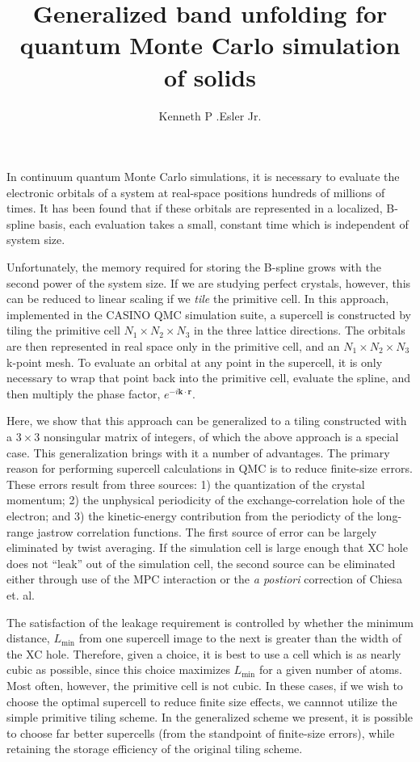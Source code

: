 \documentclass{article}
\author{Kenneth P .Esler Jr.}
\title{Generalized band unfolding for quantum Monte Carlo simulation
  of solids}
\begin{document}
\maketitle
In continuum quantum Monte Carlo simulations, it is necessary to
evaluate the electronic orbitals of a system at real-space positions
hundreds of millions of times.  It has been found that if
these orbitals are represented in a localized, B-spline basis, each
evaluation takes a small, constant time which is independent of system
size.

Unfortunately, the memory required for storing the B-spline grows with
the second power of the system size.  If we are studying perfect
crystals, however, this can be reduced to linear scaling if we {\em
  tile} the primitive cell.  In this approach, implemented in the
CASINO QMC simulation suite, a supercell is constructed by tiling the
primitive cell $N_1 \times N_2 \times N_3$ in the three lattice
directions.  The orbitals are then represented in real space only in
the primitive cell, and an $N_1 \times N_2 \times N_3$ k-point mesh.
To evaluate an orbital at any point in the supercell, it is only
necessary to wrap that point back into the primitive cell, evaluate
the spline, and then multiply the phase factor,
$e^{-i\mathbf{k}\cdot\mathbf{r}}$.  

Here, we show that this approach can be generalized to a tiling
constructed with a $3\times 3$ nonsingular matrix of integers, of which
the above approach is a special case.  This generalization brings with
it a number of advantages.  The primary reason for performing
supercell calculations in QMC is to reduce finite-size errors.  These
errors result from three sources:  1) the quantization of the crystal
momentum;  2) the unphysical periodicity of the exchange-correlation
hole of the electron; and 3) the kinetic-energy contribution from the
periodicty of the long-range jastrow correlation functions.  The first
source of error can be largely eliminated by twist averaging.  If the
simulation cell is large enough that XC hole does not ``leak'' out of
the simulation cell, the second source can be eliminated either
through use of the MPC interaction or the {\em a postiori} correction
of Chiesa et. al.  

The satisfaction of the leakage requirement is controlled by whether
the minimum distance, $L_\text{min}$ from one supercell image to the
next is greater than the width of the XC hole.  Therefore, given a
choice, it is best to use a cell which is as nearly cubic as possible,
since this choice maximizes $L_\text{min}$ for a given number of
atoms.  Most often, however, the primitive cell is not cubic.  In
these cases, if we wish to choose the optimal supercell to reduce
finite size effects, we cannnot utilize the simple primitive tiling
scheme.  In the generalized scheme we present, it is possible to
choose far better supercells (from the standpoint of finite-size
errors), while retaining the storage efficiency of the original tiling
scheme.
\end{document}
